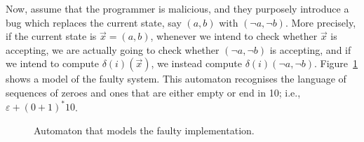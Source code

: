 Now, assume that the programmer is malicious, and they purposely introduce a bug which replaces the current state, say $(a,b)$ with $(\lnot a, \lnot b)$. 
More precisely, if the current state is $\vec{x}=(a,b)$, whenever we intend to check whether $\vec{x}$ is accepting, we are actually going to check whether $(\lnot a, \lnot b)$ is accepting, and if we intend to compute $\delta(i)(\vec{x})$, we instead compute $\delta(i)(\lnot a, \lnot b)$. 
Figure~\ref{fig:Transformed} shows a model of the faulty system. This automaton recognises the language of sequences of zeroes and ones that are either empty or end in 10; i.e., $\varepsilon+(0+1)^*10$. 
\begin{figure}[t]
    \centering
{}
\caption{Automaton that models the faulty implementation.}
\label{fig:Transformed}
\end{figure}


